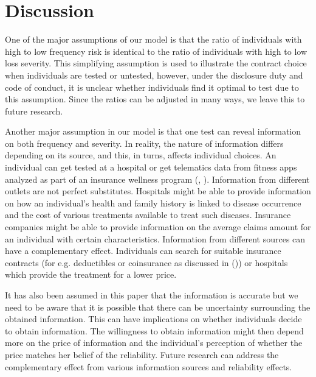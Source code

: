 \documentclass[natbib=false,preprint,12pt]{elsarticle}
\theoremstyle{plain}
\theoremstyle{definition}
\theoremstyle{plain}
\theoremstyle{TheoremNum}
\theoremstyle{CorollaryNum}
\theoremstyle{PropositionNum}
\theoremstyle{TheoremNum}
\begin{document}
\section{Discussion}

One of the major assumptions of our model is that the ratio of individuals with high to low frequency risk is identical to the ratio of individuals with high to low loss severity. This simplifying assumption is used to illustrate the contract choice when individuals are tested or untested, however, under the disclosure duty and code of conduct, it is unclear whether individuals find it optimal to test due to this assumption. Since the ratios can be adjusted in many ways, we leave this to future research.

Another major assumption in our model is that one test can reveal information on both frequency and severity. In reality, the nature of information differs depending on its source, and this, in turns, affects individual choices. An individual can get tested at a hospital or get telematics data from fitness apps analyzed as part of an insurance wellness program (\citeauthor{aziz2019machine}, \citeyear{aziz2019machine}). Information from different outlets are not perfect substitutes. Hospitals might be able to provide information on how an individual's health and family history is linked to disease occurrence and the cost of various treatments available to treat such diseases. Insurance companies might be able to provide information on the average claims amount for an individual with certain characteristics. Information from different sources can have a complementary effect. Individuals can search for suitable insurance contracts (for e.g. deductibles or coinsurance as discussed in \citeauthor{ligon2008adverse} (\citeyear{ligon2008adverse})) or hospitals which provide the treatment for a lower price.

It has also been assumed in this paper that the information is accurate but we need to be aware that it is possible that there can be uncertainty surrounding the obtained information. This can have implications on whether individuals decide to obtain information. The willingness to obtain information might then depend more on the price of information and the individual's perception of whether the price matches her belief of the reliability. Future research can address the complementary effect from various information sources and reliability effects.
\end{document}

